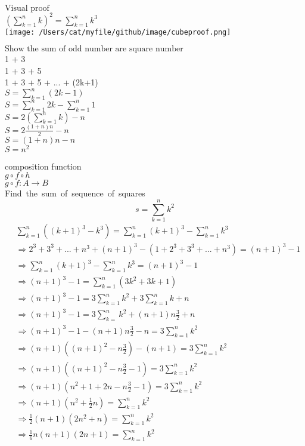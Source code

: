 \documentclass{book}
\begin{document}
\begin{flushleft}
$\text{Visual proof}$\\
$ (\sum_{k=1}^{n} k)^{2} = \sum_{k=1}^{n} k^{3}$\\
\texttt{[image: /Users/cat/myfile/github/image/cubeproof.png]}
\end{flushleft}

\begin{flushleft}
$\text{Show the sum of odd number are square number}$
\\
1 + 3\\
1 + 3 + 5 \\
1 + 3 + 5 + ... + (2k+1) \\
\medskip
$S = \sum_{k=1}^{n} (2k-1)$ \\
$S = \sum_{k=1}^{n} 2k - \sum_{k=1}^{n} 1$ \\
$S = 2(\sum_{k=1}^{n} k) - n $ \\
$S = 2 \frac{(1+n)n}{2} - n$ \\
$S = (1+n)n - n$ \\
$S = n^2 $ \\
\end{flushleft}

composition function \\
$g \circ f \circ h $ \\
$g \circ f \colon A\to B$ \\

\pagebreak
\mbox{Find the sum of sequence of squares}
    \[ s = \sum_{k=1}^{n} k^2 \]
\begin{equation}
\begin{aligned}
    & \sum_{k=1}^{n} ((k+1)^3-k^3) = \sum_{k=1}^{n} (k+1)^3 - \sum_{k=1}^{n} k^3  \\
    & \Rightarrow 2^3 + 3^3 + ... + n^3 + (n+1)^3 - (1 + 2^3 + 3^3 + ... + n^3) = (n+1)^3 -1  \\
    & \Rightarrow  \sum_{k=1}^{n}(k+1)^3 - \sum_{k=1}^{n}k^3 =(n+1)^3 - 1  \\
    & \Rightarrow (n+1)^3-1 = \sum_{k=1}^{n}(3k^2+3k+1)   \\
    & \Rightarrow (n+1)^3-1 = 3\sum_{k=1}^{n} k^2 +  3\sum_{k=1}^{n} k + n   \\
    & \Rightarrow (n+1)^3-1 = 3\sum_{k=}^{n} k^2 + (n+1) n \frac{3}{2} + n  \\
    & \Rightarrow (n+1)^3-1 -  (n+1) n \frac{3}{2} - n= 3\sum_{k=1}^{n} k^2   \\
    & \Rightarrow (n+1)((n+1)^2-n \frac{3}{2})-(n+1) = 3\sum_{k=1}^{n} k^2  \\
    & \Rightarrow (n+1)( (n+1)^2 -n\frac{3}{2}-1) = 3\sum_{k=1}^{n} k^2  	 \\
    & \Rightarrow (n+1)( n^2+1+2n-n\frac{3}{2} - 1) = 3\sum_{k=1}^{n} k^2  	 \\
    & \Rightarrow (n+1)(n^2 + \frac{1}{2}n) = \sum_{k=1}^{n} k^2  \\
    & \Rightarrow \frac{1}{2}(n+1)(2n^2+n)=\sum_{k=1}^{n} k^2  \\
    & \Rightarrow \frac{1}{6}n(n+1)(2n+1) = \sum_{k=1}^{n} k^2  \nonumber \\
\end{aligned}
\end{equation}
\end{document}
